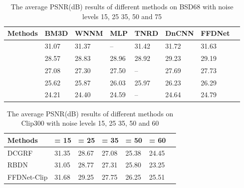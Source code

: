 \documentclass[journal]{IEEEtran}
\begin{document}
\begin{table}[!bp]\footnotesize{}
\caption{The average PSNR(dB) results of different methods on BSD68 with noise levels 15, 25 35, 50 and 75}
\center
\begin{tabular}{|p{1.2cm}<{\centering}|p{.75cm}<{\centering}|p{.75cm}<{\centering}|p{.75cm}<{\centering}|p{.75cm}<{\centering}|p{.75cm}<{\centering}|p{.75cm}<{\centering}|p{.75cm}<{\centering}|}
  \hline\rowcolor[gray]{.9}
  Methods &  BM3D&  WNNM& MLP & TNRD   &  DnCNN &   FFDNet \\ \hline
   & 31.07 &  31.37& -- &31.42  &  31.72 & 31.63  \\\hline
   & 28.57 &  28.83  & 28.96&28.92 & 29.23   & 29.19\\\hline
   & 27.08 &  27.30  & 27.50 &-- & 27.69   & 27.73\\\hline
   & 25.62 &  25.87  & 26.03 &25.97 &  26.23 & 26.29 \\\hline
   & 24.21 &  24.40  & 24.59 &-- & 24.64   & 24.79\\
  \hline
\end{tabular}\label{table_bsd68}
\end{table}

\begin{table}[!bp]\footnotesize{}
\caption{The average PSNR(dB) results of different methods on Clip300 with noise levels 15, 25 35, 50 and 60}
\center
\begin{tabular}{|p{1.75cm}<{\centering}|p{.82cm}<{\centering}|p{.82cm}<{\centering}|p{.82cm}<{\centering}|p{.82cm}<{\centering}|p{.82cm}<{\centering}|p{.82cm}<{\centering}|}
  \hline\rowcolor[gray]{.9}
  Methods    &  = 15    &  = 25   &  = 35      &  = 50     &  = 60    \\ \hline
  DCGRF      & 31.35 &  28.67   & 27.08  & 25.38  &  24.45  \\\hline
  RBDN     & 31.05  &  28.77  & 27.31  & 25.80  & 23.25   \\\hline
  FFDNet-Clip& 31.68   &  29.25 & 27.75  &26.25 & 25.51   \\
  \hline
\end{tabular}
\label{table_set300}
\end{table}
\end{document}

